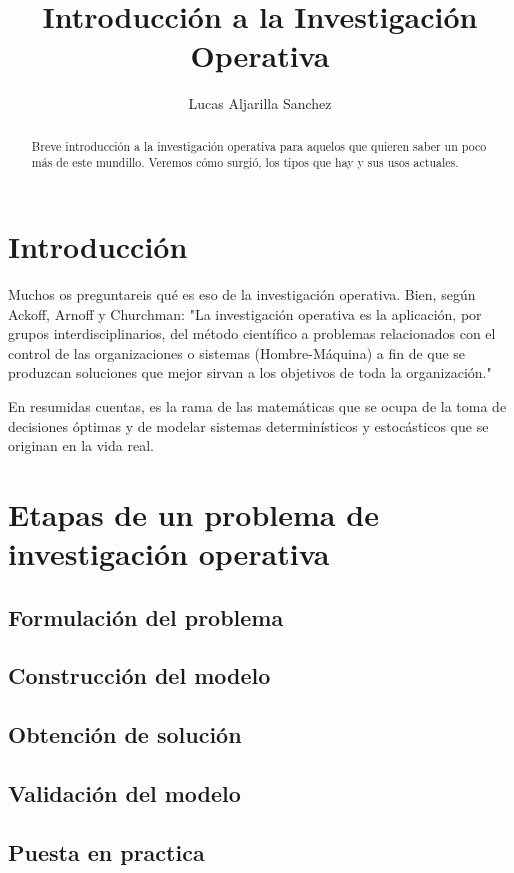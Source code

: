 \documentclass{article}
\author{Lucas Aljarilla Sanchez}
\title{Introducción a la Investigación Operativa}
\begin{document}
\maketitle
\begin{abstract}
Breve introducción a la investigación operativa para aquelos que quieren saber un poco más de este mundillo. Veremos cómo surgió, los tipos que hay y sus usos actuales.
\end{abstract}
\section{Introducción}

Muchos os preguntareis qué es eso de la investigación operativa. Bien, según Ackoff, Arnoff y Churchman: "La investigación operativa es la aplicación, por grupos interdisciplinarios, del método científico a problemas relacionados con el control de las organizaciones o sistemas (Hombre-Máquina) a fin de que se produzcan soluciones que mejor sirvan a los objetivos de toda la organización."

En resumidas cuentas, es la rama de las matemáticas que se ocupa de la toma de decisiones óptimas y de modelar sistemas determinísticos y estocásticos que se originan en la vida real.

\section{Etapas de un problema de investigación operativa}

\subsection{Formulación del problema}
\subsection{Construcción del modelo}
\subsection{Obtención de solución}
\subsection{Validación del modelo}
\subsection{Puesta en practica}
\end{document}
